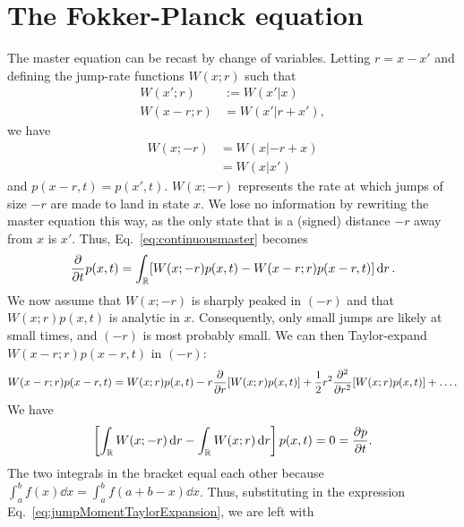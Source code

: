 \documentclass[hyperref={colorlinks=true, urlcolor=blue, citecolor=blue, final, bound}]{sfuthesis}
\begin{document}
\section{The Fokker-Planck equation}
The master equation can be recast by change of variables. Letting $r = x-x'$ and defining the jump-rate functions $W(x;r)$ such that 
\begin{align*}
    W(x';r) &{:=} W(x'|x)\\
    W(x-r; r) &= W(x'|r+x'),
\end{align*} 
we have 
\begin{align*}
    W(x;-r) &= W(x|-r+x)\\
    &= W(x|x')
\end{align*}
and $p(x-r, t) = p(x', t)$. $W(x;-r)$ represents the rate at which jumps of size $-r$ are made to land in state $x$. We lose no information by rewriting the master equation this way, as the only state that is a (signed) distance $-r$ away from $x$ is $x'$. Thus, Eq.~\ref{eq:continuousmaster} becomes
\begin{equation}
    \pdv{t} p(x,t) = \int_{\mathbb R} [W(x;-r)p(x,t)-W(x-r;r)p(x-r,t)]\dd{r}.\label{eq:rephrasedMaster}
\end{equation}
We now assume that $W(x;-r)$ is sharply peaked in $(-r)$ and that $W(x;r)p(x,t)$ is analytic in $x$. Consequently, only small jumps are likely at small times, and $(-r)$ is most probably small. We can then Taylor-expand $W(x-r;r)p(x-r,t)$ in $(-r)$:
\begin{equation}
    W(x-r;r)p(x-r,t) = W(x;r)p(x,t) - r\pdv{r} [W(x;r)p(x,t)]+\frac 12 r^2\pdv[2]{r}[W(x;r)p(x,t)]+ \dots.\label{eq:jumpMomentTaylorExpansion}
\end{equation}
We have
\begin{equation}
    \left[ \int_{\mathbb R} W(x;-r)\dd{r}-\int_{\mathbb R}W(x;r)\dd{r} \right]p(x,t) = 0 = \pdv{p}{t}.
\end{equation}
The two integrals in the bracket equal each other because $\int_a^b f(x)\dd{x} = \int_a^b f(a+b-x)\dd{x}$. Thus, substituting in the expression Eq.~\ref{eq:jumpMomentTaylorExpansion}, we are left with
\end{document}
